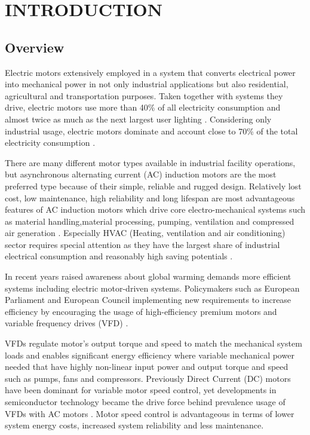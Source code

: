 \chapter{INTRODUCTION}\label{Ch1}
\section{Overview}
\label{overvıew}

Electric motors extensively employed in a system that converts electrical power into mechanical power in not only industrial applications but also residential, agricultural and transportation purposes. Taken together with systems they drive, electric motors use more than 40\% of all electricity consumption and almost twice as much as the next largest user lighting \cite{waide2011energy}. Considering only industrial usage, electric motors dominate and account close to 70\% of the total electricity consumption \cite{waide2011energy,kulterer2014policy}.

There are many different motor types available in industrial facility operations, but asynchronous alternating current (AC) induction motors are the most preferred type because of their simple, reliable and rugged design. Relatively lost cost, low maintenance, high reliability and long lifespan are most advantageous features of AC induction motors which drive core electro-mechanical systems such as material handling,material processing, pumping, ventilation and compressed air generation \cite{Fleiter2012EnergyEI}. Especially HVAC (Heating, ventilation and air conditioning) sector requires special attention as they have the largest share of industrial electrical consumption and reasonably high saving potentials \cite{Fleiter2012EnergyEI}.

In recent years raised awareness about global warming demands more efficient systems including electric motor-driven systems. Policymakers such as European Parliament and European Council implementing new requirements to increase efficiency by encouraging the usage of high-efficiency premium motors and variable frequency drives (VFD) \cite{kulterer2014policy,mikami2011historical}.

VFDs regulate motor's output torque and speed to match the mechanical system loads and enables significant energy efficiency where variable mechanical power needed that have highly non-linear input power and output torque and speed such as pumps, fans and compressors. Previously Direct Current (DC) motors have been dominant for variable motor speed control, yet developments in semiconductor technology became the drive force behind prevalence usage of VFDs with AC motors \cite{doe2008improving}. Motor speed control is advantageous in terms of lower system energy costs, increased system reliability and less maintenance.  

